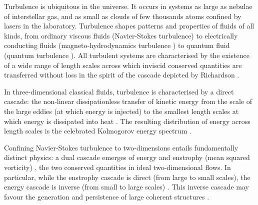 \documentclass[%
 reprint,
 amsmath,amssymb,
 aps,
 prl,
]{revtex4-2}
\def\red#1{\textcolor{red}{#1}}
\begin{document}
Turbulence is ubiquitous in the universe.  It occurs in systems
as large as nebulae of interstellar gas, and as small as clouds of
few thousands atoms confined by lasers in the laboratory.
Turbulence shapes patterns and properties of fluids of all
kinds, from ordinary
 viscous fluids (Navier-Stokes turbulence\cite{frisch1995}) 
to electrically conducting fluids (magneto-hydrodynamics turbulence
\cite{canuto-dalsgaard-1998}) to quantum fluid
(quantum turbulence \cite{barenghi-etal-2023,
Barenghi_Skrbek_Sreenivasan_2023}).
All turbulent systems are characterised by 
the existence of a wide range 
of length scales across which inviscid conserved quantities 
are transferred without loss in the spirit of the cascade 
depicted by Richardson \cite{richardson1922weather}. 

In three-dimensional classical fluids, turbulence 
is characterised by a direct cascade: the
non-linear dissipationless transfer of kinetic energy from the scale of
the large eddies (at which energy is injected) to the smallest length scales
at which energy is dissipated into heat
\cite{richardson1922weather,kolmogorov-1941}. 
The resulting distribution of energy across length scales is
the celebrated Kolmogorov energy spectrum 
\cite{kolmogorov-1941,frisch1995}. 

Confining Navier-Stokes turbulence to two-dimensions entails 
fundamentally distinct physics: a dual cascade emerges of energy and enstrophy 
(mean squared vorticity) \cite{kraichnan-1967,boffetta-ecke-2012}, 
the two conserved quantities in ideal two-dimensional flows.
In particular, while the enstrophy cascade is direct (from large to small
scales), the energy cascade is inverse (from small to large scales)
\cite{boffetta-musacchio-2010}. This inverse cascade 
may favour the generation and persistence of large coherent 
structures \cite{laurie-etal-2014}. 
\end{document}
